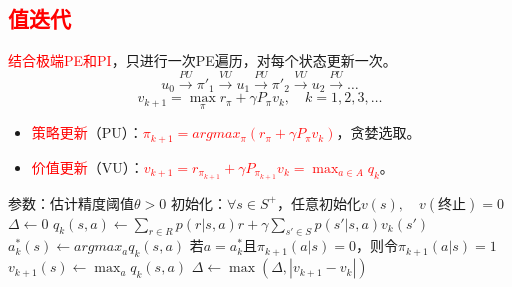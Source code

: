 \documentclass[
12pt, %
a4paper, 
oneside, %
]{scrartcl}
\begin{document}
\subsection[值迭代]{\textcolor{red}{值迭代}}
\textcolor{red}{结合极端PE和PI}，只进行一次PE遍历，对每个状态更新一次。
$$ u_0 \xrightarrow{PU} \pi'_1 \xrightarrow{VU} u_1 \xrightarrow{PU} \pi'_2 \xrightarrow{VU} u_2 \xrightarrow{PU} \dots $$
$$ v_{k + 1} = \max_{\pi} r_{\pi} + \gamma P_{\pi}v_k, \quad k = 1, 2, 3, \dots $$
\begin{itemize}
\item \textcolor{red}{策略更新}（PU）：\textcolor{red}{$ \pi_{k + 1} = argmax_{\pi}(r_{\pi} + \gamma P_{\pi}v_k) $}，贪婪选取。
\item \textcolor{red}{价值更新}（VU）：\textcolor{red}{$ v_{k + 1} = r_{\pi_{k + 1}} + \gamma P_{\pi_{k + 1}}v_k = \max_{a \in A} q_k $}。
\end{itemize}
\begin{myalgorithm}[值迭代]
\State 参数：估计精度阈值$ \theta > 0 $
\State 初始化：$ \forall s \in S^+ $，任意初始化$ v(s), \quad v(\text{终止}) = 0 $
\Repeat
\State $ \Delta \gets 0 $
\State $ q_k(s, a) \gets \sum_{r \in R} p(r|s, a)r + \gamma \sum_{s' \in S} p(s'|s, a)v_k(s') $
\State $ a^*_k(s) \gets argmax_a q_k(s, a) $ 
\State 若$ a = a^*_k $且$ \pi_{k + 1}(a|s) = 0 $，则令$ \pi_{k + 1}(a|s) = 1 $ 
\State $ v_{k + 1}(s) \gets \max_a q_k(s, a) $ 
\State $ \Delta \gets \max(\Delta, |v_{k + 1} - v_k|) $ 
\EndFor
\EndFor
\Until{$ \Delta < \theta $}
\end{myalgorithm}
\end{document}
